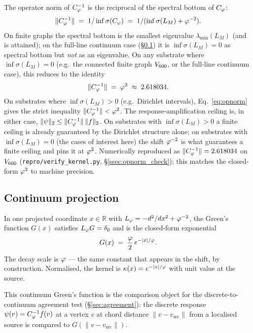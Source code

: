 The operator norm of $C_{\varphi}^{-1}$ is the reciprocal of the
spectral bottom of $C_{\varphi}$:
\begin{equation}\label{eq:opnorm}
\|C_{\varphi}^{-1}\| \;=\; 1/\inf \sigma(C_{\varphi})
              \;=\; 1/(\inf \sigma(L_M) + \varphi^{-2}).
\end{equation}
On finite graphs the spectral bottom is the smallest eigenvalue
$\lambda_{\min}(L_M)$ (and is attained); on the full-line
continuum case (\S\ref{ssec:continuum}) it is $\inf \sigma(L_M)=0$
as spectral bottom but \emph{not} as an eigenvalue. On any
substrate where $\inf \sigma(L_M) = 0$ (e.g.\ the connected finite
graph $V_{600}$, or the full-line continuum case), this
reduces to the identity
\begin{equation}\label{eq:opnorm_zero_mode}
\|C_{\varphi}^{-1}\| \;=\; \varphi^{2} \;\approx\; 2.618034.
\end{equation}
On substrates where $\inf \sigma(L_M) > 0$ (e.g.\ Dirichlet
intervals), Eq.~\eqref{eq:opnorm} gives the strict inequality
$\|C_{\varphi}^{-1}\| < \varphi^{2}$. The response-amplification ceiling is,
in either case, $\|\psi\|_{2} \leq \|C_{\varphi}^{-1}\|\, \|f\|_{2}$. On
substrates with $\inf \sigma(L_M) > 0$ a finite ceiling is already
guaranteed by the Dirichlet structure alone; on substrates with
$\inf \sigma(L_M) = 0$ (the cases of interest here) the shift
$\varphi^{-2}$ is what guarantees a finite ceiling and pins it at
$\varphi^{2}$. Numerically reproduced as $\|C_{\varphi}^{-1}\| =
2.618034$ on $V_{600}$ (\texttt{repro/verify\_kernel.py},
\S\ref{ssec:opnorm_check}); this matches the closed-form $\varphi^{2}$
to machine precision.

\subsection{Continuum projection}\label{ssec:continuum}

In one projected coordinate $x \in \mathbb{R}$ with
$L_{\varphi} = -d^{2}/dx^{2} + \varphi^{-2}$, the Green's function
$G(x)$ satisfies $L_{\varphi} G = \delta_{0}$ and is the closed-form
exponential
\begin{equation}\label{eq:green_continuum}
G(x) \;=\; \frac{\varphi}{2}\, e^{-|x|/\varphi}.
\end{equation}
The decay scale is $\varphi$ — the same constant that appears in the
shift, by construction. Normalised, the kernel is
$\kappa(x) = e^{-|x|/\varphi}$ with unit value at the source.

This continuum Green's function is the comparison object for the
discrete-to-continuum agreement test (\S\ref{sec:agreement}):
the discrete response $\psi(v) = C_{\varphi}^{-1} f(v)$ at a vertex $v$ at
chord distance $\|v - v_{\mathrm{src}}\|$ from a localised source
is compared to $G(\|v - v_{\mathrm{src}}\|)$.


